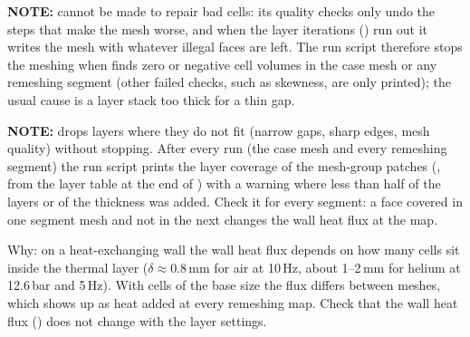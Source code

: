 \textbf{NOTE:}  cannot be made to repair bad cells: its quality checks only undo the steps that make the mesh worse, and when the layer iterations () run out it writes the mesh with whatever illegal faces are left. The run script therefore stops the meshing when  finds zero or negative cell volumes in the case mesh or any remeshing segment (other failed checks, such as skewness, are only printed); the usual cause is a layer stack too thick for a thin gap.

\textbf{NOTE:}  drops layers where they do not fit (narrow gaps, sharp edges, mesh quality) without stopping. After every  run (the case mesh and every remeshing segment) the run script prints the layer coverage of the mesh-group patches (, from the layer table at the end of ) with a warning where less than half of the layers or of the thickness was added. Check it for every segment: a face covered in one segment mesh and not in the next changes the wall heat flux at the map.

Why: on a heat-exchanging wall the wall heat flux depends on how many cells sit inside the thermal layer ($\delta \approx 0.8$\,mm for air at 10\,Hz, about 1--2\,mm for helium at 12.6\,bar and 5\,Hz). With cells of the base size the flux differs between meshes, which shows up as heat added at every remeshing map. Check that the wall heat flux () does not change with the layer settings.

